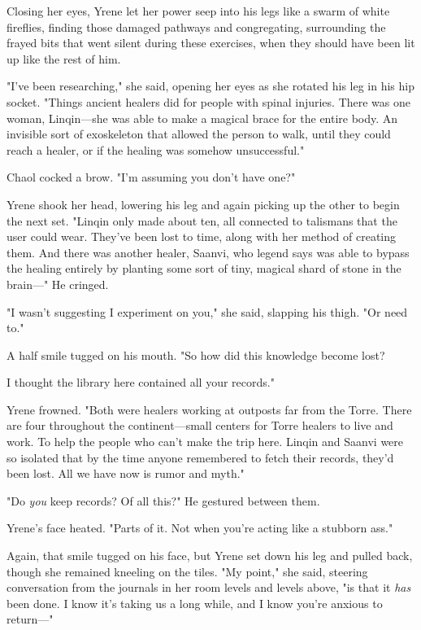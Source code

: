 Closing her eyes, Yrene let her power seep into his legs like a swarm of white fireflies, finding those damaged pathways and congregating, surrounding the frayed bits that went silent during these exercises, when they should have been lit up like the rest of him.

"I've been researching," she said, opening her eyes as she rotated his leg in his hip socket.
"Things ancient healers did for people with spinal injuries.
There was one woman, Linqin---she was able to make a magical brace for the entire body.
An invisible sort of exoskeleton that allowed the person to walk, until they could reach a healer, or if the healing was somehow unsuccessful."

Chaol cocked a brow.
"I'm assuming you don't have one?"

Yrene shook her head, lowering his leg and again picking up the other to begin the next set.
"Linqin only made about ten, all connected to talismans that the user could wear.
They've been lost to time, along with her method of creating them.
And there was another healer, Saanvi, who legend says was able to bypass the healing entirely by planting some sort of tiny, magical shard of stone in the brain---" He cringed.

"I wasn't suggesting I experiment on you," she said, slapping his thigh.
"Or need to."

A half smile tugged on his mouth.
"So how did this knowledge become lost?

I thought the library here contained all your records."

Yrene frowned.
"Both were healers working at outposts far from the Torre.
There are four throughout the continent---small centers for Torre healers to live and work.
To help the people who can't make the trip here.
Linqin and Saanvi were so isolated that by the time anyone remembered to fetch their records, they'd been lost.
All we have now is rumor and myth."

"Do \emph{you} keep records?
Of all this?"
He gestured between them.

Yrene's face heated.
"Parts of it.
Not when you're acting like a stubborn ass."

Again, that smile tugged on his face, but Yrene set down his leg and pulled back, though she remained kneeling on the tiles.
"My point," she said, steering conversation from the journals in her room levels and levels above, "is that it \emph{has} been done.
I know it's taking us a long while, and I know you're anxious to return---"

